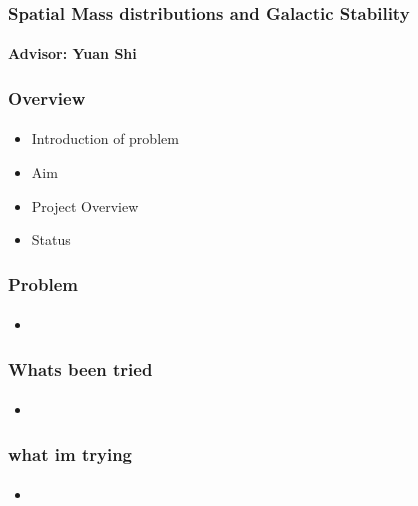 \documentclass[18pt]{beamer}
\begin{document}
\begin{frame}
    \frametitle{Spatial Mass distributions and Galactic Stability}
    \framesubtitle{Advisor: Yuan Shi}
\end{frame}








\begin{frame}
    \frametitle{Overview}
    \framesubtitle{}
    \begin{itemize}
        \item Introduction of problem
        \item Aim
        \item Project Overview
        \item Status
    \end{itemize}
\end{frame}
\begin{frame}
    \frametitle{Problem}
    \framesubtitle{}
    \begin{itemize}
        \item 
    \end{itemize}
\end{frame}

\begin{frame}
    \frametitle{Whats been tried}
    \framesubtitle{}
    \begin{itemize}
        \item 
    \end{itemize}
\end{frame}

\begin{frame}
    \frametitle{what im trying}
    \framesubtitle{}
    \begin{itemize}
        \item 
    \end{itemize}
\end{frame}
\end{document}
